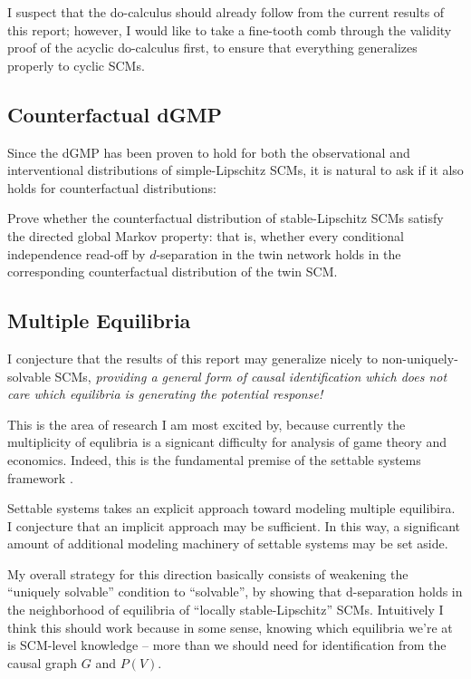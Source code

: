 \documentclass[12pt]{article}
\begin{document}
I suspect that the do-calculus should already follow from the current results of this report; however, I would like to take a fine-tooth comb through the validity proof of the acyclic do-calculus first, to ensure that everything generalizes properly to cyclic SCMs.

\subsection{Counterfactual dGMP}

Since the dGMP has been proven to hold for both the observational and interventional distributions of simple-Lipschitz SCMs, it is natural to ask if it also holds for counterfactual distributions:

\begin{problem}
\label{prob:count}

Prove whether the counterfactual distribution of stable-Lipschitz SCMs satisfy the directed global Markov property: that is, whether every conditional independence read-off by $d$-separation in the twin network holds in the corresponding counterfactual distribution of the twin SCM.
\end{problem}

\subsection{Multiple Equilibria}

I conjecture that the results of this report may generalize nicely to non-uniquely-solvable SCMs, \emph{providing a general form of causal identification which does not care which equilibria is generating the potential response!}

This is the area of research I am most excited by, because currently the multiplicity of equlibria is a signicant difficulty for analysis of game theory and economics. Indeed, this is the fundamental premise of the settable systems framework \cite{White&Chalak}.

Settable systems takes an explicit approach toward modeling multiple equilibira. I conjecture that an implicit approach may be sufficient. In this way, a significant amount of additional modeling machinery of settable systems may be set aside.

My overall strategy for this direction basically consists of weakening the “uniquely solvable” condition to “solvable”, by showing that d-separation holds in the neighborhood of equilibria of “locally stable-Lipschitz” SCMs. 
Intuitively I think this should work because in some sense, knowing which equilibria we’re at is SCM-level knowledge – more than we should need for identification from the causal graph $G$ and $P(V)$.
\end{document}
